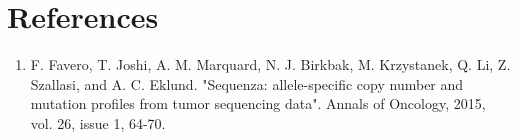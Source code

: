 \newpage


\section{References}

\begin{enumerate}
  \item F. Favero, T. Joshi, A. M. Marquard, N. J. Birkbak, M. Krzystanek, Q. Li, Z. Szallasi, and A. C. Eklund. "Sequenza: allele-specific copy number and mutation profiles from tumor sequencing data". Annals of Oncology, 2015, vol. 26, issue 1, 64-70.
\end{enumerate}
